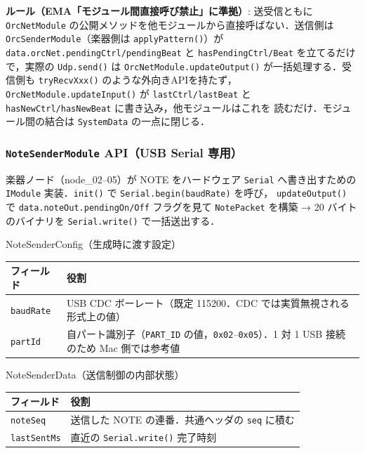 \documentclass[lualatex,book,paper=a4paper,jafontsize=11.5pt,jafontscale=1.05]{jlreq}
\begin{document}
\textbf{ルール（EMA「モジュール間直接呼び禁止」に準拠）}: 送受信ともに \texttt{OrcNetModule}
の公開メソッドを他モジュールから直接呼ばない．送信側は \texttt{OrcSenderModule}（楽器側は
\texttt{applyPattern()}）が \texttt{data.orcNet.pendingCtrl/pendingBeat} と
\texttt{hasPendingCtrl/Beat} を立てるだけで，実際の \texttt{Udp.send()} は
\texttt{OrcNetModule.updateOutput()} が一括処理する．受信側も
\texttt{tryRecvXxx()} のような外向きAPIを持たず，\texttt{OrcNetModule.updateInput()} が
\texttt{lastCtrl/lastBeat} と \texttt{hasNewCtrl/hasNewBeat} に書き込み，他モジュールはこれを
読むだけ．モジュール間の結合は \texttt{SystemData} の一点に閉じる．

\subsubsection{\texttt{NoteSenderModule} API（USB Serial 専用）}

楽器ノード（node\_02--05）が NOTE をハードウェア \texttt{Serial} へ書き出すための
\texttt{IModule} 実装．\texttt{init()} で \texttt{Serial.begin(baudRate)} を呼び，
\texttt{updateOutput()} で \texttt{data.noteOut.pendingOn/Off} フラグを見て
\texttt{NotePacket} を構築 → 20 バイトのバイナリを \texttt{Serial.write()} で一括送出する．

\begin{apibox}{NoteSenderConfig（生成時に渡す設定）}
\begin{tabular}{l p{}}
\toprule
\textbf{フィールド} & \textbf{役割} \\
\midrule
\texttt{baudRate} & USB CDC ボーレート（既定 115200．CDC では実質無視される形式上の値） \\
\texttt{partId}   & 自パート識別子（\texttt{PART\_ID} の値，\texttt{0x02}--\texttt{0x05}）．1 対 1 USB 接続のため Mac 側では参考値 \\
\bottomrule
\end{tabular}
\end{apibox}

\begin{apibox}{NoteSenderData（送信制御の内部状態）}
\begin{tabular}{l p{}}
\toprule
\textbf{フィールド} & \textbf{役割} \\
\midrule
\texttt{noteSeq}    & 送信した NOTE の連番．共通ヘッダの \texttt{seq} に積む \\
\texttt{lastSentMs} & 直近の \texttt{Serial.write()} 完了時刻 \\
\bottomrule
\end{tabular}
\end{apibox}
\end{document}
